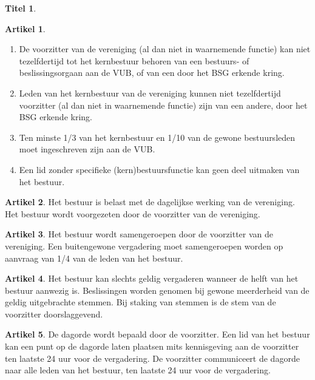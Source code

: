 \documentclass[a4paper,10pt]{article}
\theoremstyle{definition}
\newtheorem{titel}{\newline\Large Titel}
\newtheorem{artikelbase}{\large Artikel}
\newenvironment{artikel}
  {\begin{artikelbase}}
  {\smallskip
   \end{artikelbase}}
\newcommand{\ttextcr}{\hfill\newline}
\newcommand{\ttextenum}{\mbox{}}
\begin{document}
\begin{titel}
  \begin{artikel}\ttextenum
    \begin{enumerate}
      \item De voorzitter van de vereniging (al dan niet in waarnemende functie) kan niet tezelfdertijd tot het kernbestuur behoren van een bestuurs- of beslissingsorgaan aan de VUB, of van een door het BSG erkende kring.
      \item Leden van het kernbestuur van de vereniging kunnen niet tezelfdertijd voorzitter (al dan niet in waarnemende functie) zijn van een andere, door het BSG erkende kring. %
      \item Ten minste 1/3 van het kernbestuur en 1/10 van de gewone bestuursleden moet ingeschreven zijn aan de VUB.
      \item Een lid zonder specifieke (kern)bestuursfunctie kan geen deel uitmaken van het bestuur.
    \end{enumerate}
  \end{artikel}

  \begin{artikel}\ttextcr
    Het bestuur is belast met de dagelijkse werking van de vereniging.
    Het bestuur wordt voorgezeten door de voorzitter van de vereniging.
  \end{artikel}

  \begin{artikel}\ttextcr
    Het bestuur wordt samengeroepen door de voorzitter van de vereniging.
    Een buitengewone vergadering moet samengeroepen worden op aanvraag van 1/4 van de leden van het bestuur.
  \end{artikel}

  \begin{artikel}\ttextcr
    Het bestuur kan slechts geldig vergaderen wanneer de helft van het bestuur aanwezig is.
    Beslissingen worden genomen bij gewone meerderheid van de geldig uitgebrachte stemmen.
    Bij staking van stemmen is de stem van de voorzitter doorslaggevend.
  \end{artikel}

  \begin{artikel}\ttextcr
    De dagorde wordt bepaald door de voorzitter.
    Een lid van het bestuur kan een punt op de dagorde laten plaatsen mits kennisgeving aan de voorzitter ten laatste 24 uur voor de vergadering.
    De voorzitter communiceert de dagorde naar alle leden van het bestuur, ten laatste 24 uur voor de vergadering.
  \end{artikel}

\end{titel}
\end{document}
